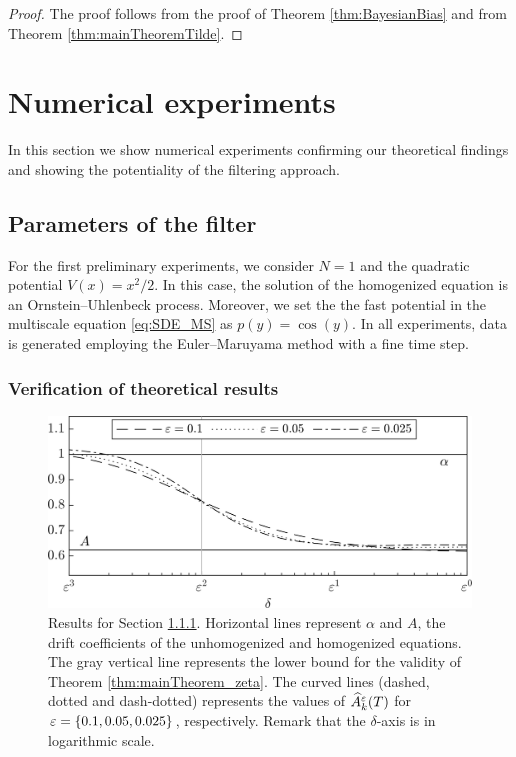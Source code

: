 \documentclass[10pt]{article}
\begin{document}
\begin{proof} The proof follows from the proof of Theorem \ref{thm:BayesianBias} and from Theorem \ref{thm:mainTheoremTilde}.
\end{proof}


\section{Numerical experiments}\label{sec:NumExp}

In this section we show numerical experiments confirming our theoretical findings and showing the potentiality of the filtering approach.

\subsection{Parameters of the filter}\label{sec:Num_Param}

For the first preliminary experiments, we consider $N = 1$ and the quadratic potential $V(x) = x^2/2$. In this case, the solution of the homogenized equation is an Ornstein--Uhlenbeck process. Moreover, we set the the fast potential in the multiscale equation \eqref{eq:SDE_MS} as $p(y) = \cos(y)$. In all experiments, data is generated employing the Euler--Maruyama method with a fine time step.

\subsubsection{Verification of theoretical results}\label{sec:Num_Param1}

\begin{figure}[t]
	\centering
	\includegraphics[]{Figures/Transition}
	\caption{Results for Section \ref{sec:Num_Param1}. Horizontal lines represent $\alpha$ and $A$, the drift coefficients of the unhomogenized and homogenized equations. The gray vertical line represents the lower bound for the validity of Theorem \ref{thm:mainTheorem_zeta}. The curved lines (dashed, dotted and dash-dotted) represents the values of $\widehat A_k^\varepsilon(T)$ for $\varepsilon = \{0.1, 0.05, 0.025\}$, respectively. Remark that the $\delta$-axis is in logarithmic scale.}
	\label{fig:TheoremVerification}
\end{figure}
\end{document}
